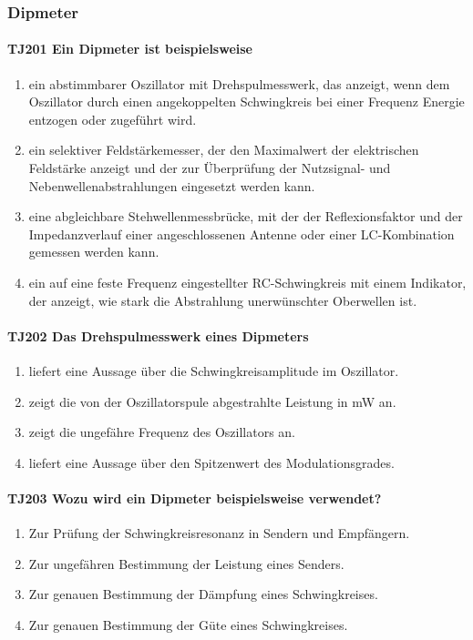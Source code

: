 \documentclass[8pt]{article}
\begin{document}
\pagebreak
\subsubsection{Dipmeter}
\paragraph*{TJ201 Ein Dipmeter ist beispielsweise}
\begin{enumerate}[nolistsep,label=\Alph*]
\item ein abstimmbarer Oszillator mit Drehspulmesswerk, das anzeigt, wenn dem Oszillator durch einen angekoppelten Schwingkreis bei einer Frequenz Energie entzogen oder zugeführt wird.
\item ein selektiver Feldstärkemesser, der den Maximalwert der elektrischen Feldstärke anzeigt und der zur Überprüfung der Nutzsignal- und Nebenwellenabstrahlungen eingesetzt werden kann.
\item eine abgleichbare Stehwellenmessbrücke, mit der der Reflexionsfaktor und der Impedanzverlauf einer angeschlossenen Antenne oder einer LC-Kombination gemessen werden kann. 
\item ein auf eine feste Frequenz eingestellter RC-Schwingkreis mit einem Indikator, der anzeigt, wie stark die Abstrahlung unerwünschter Oberwellen ist.
\end{enumerate}

\paragraph*{TJ202 Das Drehspulmesswerk eines Dipmeters}
\begin{enumerate}[nolistsep,label=\Alph*]
\item liefert eine Aussage über die Schwingkreisamplitude im Oszillator. 
\item zeigt die von der Oszillatorspule abgestrahlte Leistung in mW an.
\item zeigt die ungefähre Frequenz des Oszillators an.
\item liefert eine Aussage über den Spitzenwert des Modulationsgrades.
\end{enumerate}

\paragraph*{TJ203 Wozu wird ein Dipmeter beispielsweise verwendet?}
\begin{enumerate}[nolistsep,label=\Alph*]
\item Zur Prüfung der Schwingkreisresonanz in Sendern und Empfängern.
\item Zur ungefähren Bestimmung der Leistung eines Senders.
\item Zur genauen Bestimmung der Dämpfung eines Schwingkreises.
\item Zur genauen Bestimmung der Güte eines Schwingkreises.
\end{enumerate}
\end{document}
